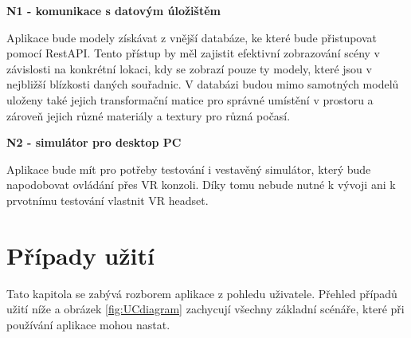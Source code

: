 \documentclass[thesis=B,czech]{FITthesis}[2012/06/26]
\begin{document}
 		\begin{description}
 		
 		\item \textbf{N1 - komunikace s datovým úložištěm}
 		
 		Aplikace bude modely získávat z vnější databáze, ke které bude přistupovat pomocí RestAPI. Tento přístup by měl zajistit efektivní zobrazování scény v závislosti na konkrétní lokaci, kdy se zobrazí pouze ty modely, které jsou v nejbližší blízkosti daných souřadnic. V databázi budou mimo samotných modelů uloženy také jejich transformační matice pro správné umístění v prostoru a zároveň jejich různé materiály a textury pro různá počasí.
 		
 		\item \textbf{N2 - simulátor pro desktop PC}
 		
 		Aplikace bude mít pro potřeby testování i vestavěný simulátor, který bude napodobovat ovládání přes VR konzoli. Díky tomu nebude nutné k vývoji ani k prvotnímu testování vlastnit VR headset.
 		
 		
 	\end{description}	
 	
	\section{Případy užití}
	Tato kapitola se zabývá rozborem aplikace z pohledu uživatele. Přehled případů užití níže a obrázek \ref{fig:UCdiagram} zachycují všechny základní scénáře, které při používání aplikace mohou nastat.
	
\end{document}
